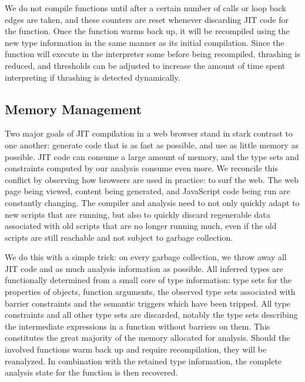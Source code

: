 We do not compile functions until after a certain number of calls or loop back
edges are taken, and these counters are reset whenever discarding JIT code
for the function.
Once the function warms back up, it will be recompiled using the new type information
in the same manner as its initial compilation.
Since the function will execute in the interpreter some before
being recompiled, thrashing is reduced, and thresholds can be adjusted to
increase the amount of time spent interpreting if thrashing is detected
dynamically.

\subsection{Memory Management}
\label{sec:memory}

Two major goals of JIT compilation in a web browser stand in stark contrast
to one another: generate code that is as fast as possible, and use as little
memory as possible.
JIT code can consume a large amount of memory, and the type sets and constraints
computed by our analysis consume even more.
We reconcile this conflict by observing how browsers are used in practice:
to surf the web.
The web page being viewed, content being generated, and JavaScript code being
run are constantly changing.
The compiler and analysis need to not only quickly adapt to new scripts that are
running, but also to quickly discard regenerable data associated with
old scripts that are no longer running much, even if the old scripts are still
reachable and not subject to garbage collection.

We do this with a simple trick:
on every garbage collection, we throw away all JIT code and as much analysis
information as possible.
All inferred types are functionally determined from a small core of type
information:
type sets for the properties of objects, function arguments, the observed
type sets associated with barrier constraints and the semantic triggers which
have been tripped.
All type constraints and all other type sets are discarded, notably the type sets
describing the intermediate expressions in a function without barriers on them.
This constitutes the great majority of the memory allocated for analysis.
Should the involved functions warm back up and require recompilation,
they will be reanalyzed. In combination with the retained type information,
the complete analysis state for the function is then recovered.

